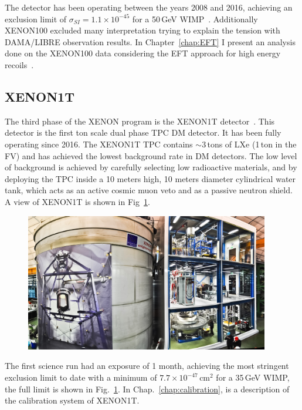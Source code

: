 The detector has been operating between the years 2008 and 2016, achieving an exclusion limit of $\sigma_{SI} = 1.1 \times 10^{-45}$ for a 50\,GeV WIMP~\cite{xe100_run_combination}. Additionally XENON100 excluded many interpretation trying to explain the tension with DAMA/LIBRE observation results. In Chapter~\ref{chap:EFT} I present an analysis done on the XENON100 data considering the EFT approach for high energy recoils~\cite{Aprile:2017aas}.  

\subsection{XENON1T}
\label{sec:xe1T}

The third phase of the XENON program is the XENON1T detector~\cite{Aprile:2017aty}. This detector is the first ton scale dual phase TPC  DM detector. It has been fully operating since 2016. The XENON1T TPC contains $\sim 3$\,tons of LXe (1\,ton in the FV) and has achieved the lowest background rate in DM detectors. The low level of background is achieved by carefully selecting low radioactive materials, and by deploying the TPC inside a 10 meters high, 10 meters diameter cylindrical water tank, which acts as an active cosmic muon veto and as a passive neutron shield. A view of XENON1T is shown in Fig~\ref{fig:xe1tLim}.

\begin{figure}[]
	\centering
	\includegraphics[width=0.95\textwidth]{figs/xe1tImg.png}
	\label{fig:xe1tLim}
\end{figure}

The first science run had an exposure of 1 month, achieving the most stringent  exclusion limit to date with a minimum of $7.7\times10^{-47}$\,cm$^2$ for a 35\,GeV WIMP, the full limit is shown in Fig.~\ref{fig:xe1tLim}. In Chap.~\ref{chap:calibration}, is a description of the calibration system of XENON1T.
 
